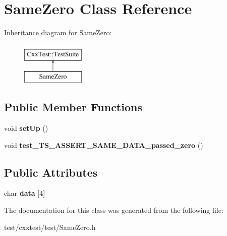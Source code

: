 \hypertarget{classSameZero}{\section{Same\-Zero Class Reference}
\label{classSameZero}
}
Inheritance diagram for Same\-Zero\-:\begin{figure}[H]
\begin{center}
\leavevmode
\includegraphics[height=2.000000cm]{classSameZero}
\end{center}
\end{figure}
\subsection*{Public Member Functions}
\begin{DoxyCompactItemize}
\item 
\hypertarget{classSameZero_a96cf622512523bfb052a94eb6e8ba07e}{void {\bfseries set\-Up} ()}\label{classSameZero_a96cf622512523bfb052a94eb6e8ba07e}

\item 
\hypertarget{classSameZero_a281655be301d673dbec6d51cf16c32f0}{void {\bfseries test\-\_\-\-T\-S\-\_\-\-A\-S\-S\-E\-R\-T\-\_\-\-S\-A\-M\-E\-\_\-\-D\-A\-T\-A\-\_\-passed\-\_\-zero} ()}\label{classSameZero_a281655be301d673dbec6d51cf16c32f0}

\end{DoxyCompactItemize}
\subsection*{Public Attributes}
\begin{DoxyCompactItemize}
\item 
\hypertarget{classSameZero_a52aa19f57b364281043fb9559f143d06}{char {\bfseries data} \mbox{[}4\mbox{]}}\label{classSameZero_a52aa19f57b364281043fb9559f143d06}

\end{DoxyCompactItemize}


The documentation for this class was generated from the following file\-:\begin{DoxyCompactItemize}
\item 
test/cxxtest/test/Same\-Zero.\-h\end{DoxyCompactItemize}
